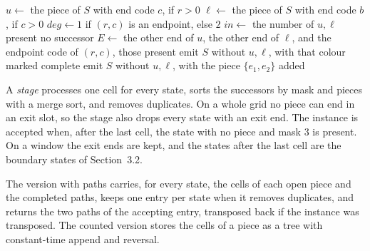 \documentclass[11pt]{article}
\begin{document}
\begin{algorithm}[H]
\caption{Step of cell $(r,c)$ for one state $S$}
\begin{algorithmic}[1]
\State $u \gets$ the piece of $S$ with end code $c$, if $r>0$
\State $\ell \gets$ the piece of $S$ with end code $b$, if $c>0$
\State $\mathit{deg} \gets 1$ if $(r,c)$ is an endpoint, else $2$
\State $\mathit{in} \gets$ the number of $u,\ell$ present
  \State \Return no successor
\EndIf
\State $E \gets$ the other end of $u$, the other end of $\ell$, and the endpoint code of $(r,c)$,
  those present
        \State emit $S$ without $u,\ell$, with that colour marked complete
      \EndIf
    \Else
      \State emit $S$ without $u,\ell$, with the piece $\{e_1,e_2\}$ added
    \EndIf
  \EndIf
\EndFor
\end{algorithmic}
\end{algorithm}

A \emph{stage} processes one cell for every state, sorts the successors by mask and pieces with a
merge sort, and removes duplicates. On a whole grid no piece can end in an exit slot, so the stage
also drops every state with an exit end. The instance is accepted when, after the last cell, the
state with no piece and mask $3$ is present. On a window the exit ends are kept, and the states
after the last cell are the boundary states of Section~3.2.

The version with paths carries, for every state, the cells of each open piece and the completed
paths, keeps one entry per state when it removes duplicates, and returns the two paths of the
accepting entry, transposed back if the instance was transposed. The counted version stores the
cells of a piece as a tree with constant-time append and reversal.
\end{document}
